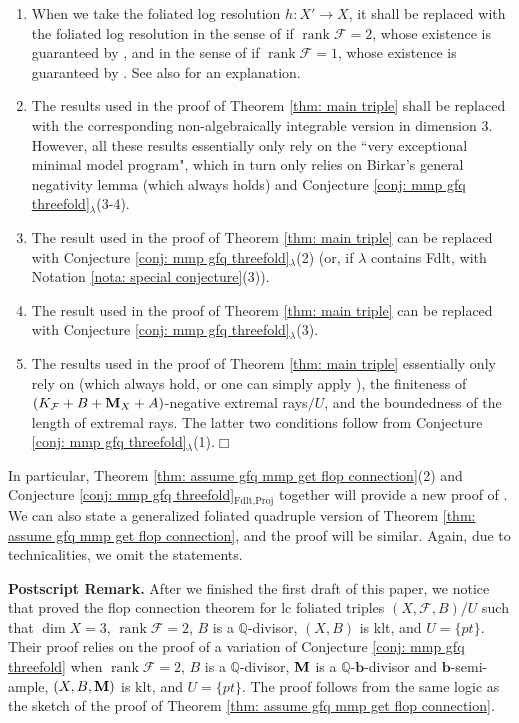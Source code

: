 \documentclass[11pt]{amsart}
\numberwithin{equation}{section}
\newcommand{\bb}{\bm{b}}
\newcommand{\Mm}{{\bf{M}}}
\newcommand{\Qq}{\mathbb{Q}}
\newcommand{\rk}{\operatorname{rank}}
\newcommand{\Ff}{\mathcal{F}}
\theoremstyle{definition}
\theoremstyle{definition}
\theoremstyle{definition}
\begin{document}
\begin{enumerate} 
\item When we take the foliated log resolution $h: X'\rightarrow X$, it shall be replaced with the foliated log resolution in the sense of \cite[Definition 3.1]{CS21} if $\rk\Ff=2$, whose existence is guaranteed by \cite{Can04}, and in the sense of \cite[Definition 4.4]{LLM23} if $\rk\Ff=1$, whose existence is guaranteed by \cite{MP13}. See also \cite[Theorem 4.5]{LLM23} for an explanation. 
\item The results \cite[Lemma 4.13, A.25, A.28]{LMX24b} used in the proof of Theorem \ref{thm: main triple} shall be replaced with the corresponding non-algebraically integrable version in dimension 3. However, all these results essentially only rely on the ``very exceptional minimal model program", which in turn only relies on Birkar's general negativity lemma \cite[Lemma 3.3]{Bir12} (which always holds) and Conjecture \ref{conj: mmp gfq threefold}{$_\lambda$}(3-4). \item The result \cite[Theorem 7.2]{LMX24b} used in the proof of Theorem \ref{thm: main triple} can be replaced with Conjecture \ref{conj: mmp gfq threefold}{$_\lambda$}(2) (or, if $\lambda$ contains Fdlt, with Notation \ref{nota: special conjecture}(3)). 
\item The result \cite[Theorem A.13]{LMX24b} used in the proof of Theorem \ref{thm: main triple} can be replaced with Conjecture \ref{conj: mmp gfq threefold}{$_\lambda$}(3). 
\item The results \cite[Theorem 1.12, Lemma B.6]{LMX24b} used in the proof of Theorem \ref{thm: main triple} essentially only rely on \cite[Lemma 5.3]{HLS19} (which always hold, or one can simply apply \cite[Theorem 1.2]{LMX24a}), the finiteness of $(K_{\Ff}+B+\Mm_X+A)$-negative extremal rays$/U$, and the boundedness of the length of extremal rays. The latter two conditions follow from Conjecture \ref{conj: mmp gfq threefold}{$_\lambda$}(1).\hfill$\Box$ \end{enumerate}

In particular, Theorem \ref{thm: assume gfq mmp get flop connection}(2) and Conjecture \ref{conj: mmp gfq threefold}$_{\text{Fdlt,Proj}}$ together will provide a new proof of \cite[Theorem 1.1]{JV23}. We can also state a generalized foliated quadruple version of Theorem \ref{thm: assume gfq mmp get flop connection}, and the proof will be similar. Again, due to technicalities, we omit the statements.

\noindent\textbf{Postscript Remark.} After we finished the first draft of this paper, we notice that \cite[Theorem 8.1]{CM24} proved the flop connection theorem for lc foliated triples $(X,\Ff,B)/U$ such that $\dim X=3$, $\rk\Ff=2$, $B$ is a $\Qq$-divisor, $(X,B)$ is klt, and $U=\{pt\}$. Their proof relies on the proof of a variation of Conjecture \ref{conj: mmp gfq threefold} when $\rk\Ff=2$, $B$ is a $\Qq$-divisor, $\Mm$ is a $\Qq$-$\bb$-divisor and $\bb$-semi-ample, $(X,B,\Mm)$ is klt, and $U=\{pt\}$. The proof follows from the same logic as the sketch of the proof of Theorem \ref{thm: assume gfq mmp get flop connection}.
\end{document}
